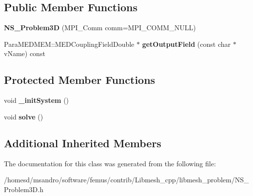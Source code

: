 \subsection*{Public Member Functions}
\begin{DoxyCompactItemize}
\item 
\hypertarget{class_n_s___problem3_d_aa5a745dbba07071135a65050f222dfb3}{{\bfseries N\-S\-\_\-\-Problem3\-D} (M\-P\-I\-\_\-\-Comm comm=M\-P\-I\-\_\-\-C\-O\-M\-M\-\_\-\-N\-U\-L\-L)}\label{class_n_s___problem3_d_aa5a745dbba07071135a65050f222dfb3}

\item 
\hypertarget{class_n_s___problem3_d_a27c720f9ccc76f28a22fd4d069e2234c}{Para\-M\-E\-D\-M\-E\-M\-::\-M\-E\-D\-Coupling\-Field\-Double $\ast$ {\bfseries get\-Output\-Field} (const char $\ast$v\-Name) const }\label{class_n_s___problem3_d_a27c720f9ccc76f28a22fd4d069e2234c}

\end{DoxyCompactItemize}
\subsection*{Protected Member Functions}
\begin{DoxyCompactItemize}
\item 
\hypertarget{class_n_s___problem3_d_aa75a9508c7c6d2681444278e4fc85d3c}{void {\bfseries \-\_\-init\-System} ()}\label{class_n_s___problem3_d_aa75a9508c7c6d2681444278e4fc85d3c}

\item 
\hypertarget{class_n_s___problem3_d_a7f0d1aeec7fec9cf33289344452ff3f3}{void {\bfseries solve} ()}\label{class_n_s___problem3_d_a7f0d1aeec7fec9cf33289344452ff3f3}

\end{DoxyCompactItemize}
\subsection*{Additional Inherited Members}


The documentation for this class was generated from the following file\-:\begin{DoxyCompactItemize}
\item 
/homesd/msandro/software/femus/contrib/\-Libmesh\-\_\-cpp/libmesh\-\_\-problem/N\-S\-\_\-\-Problem3\-D.\-h\end{DoxyCompactItemize}
